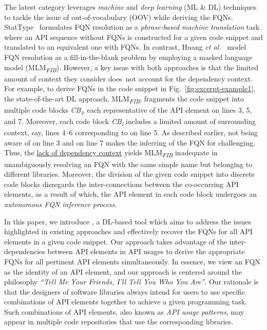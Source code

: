 The latest category leverages {\em machine} and {\em deep learning}
(ML \& DL) techniques to tackle the issue of out-of-vocabulary (OOV)
while deriving the FQNs.  StatType~\cite{icse18} formulates FQN
resolution as a {\em phrase-based machine translation} task where an
API sequence without FQNs is constructed for a given code snippet and
translated to an equivalent one with FQNs. In contrast, Huang {\em et
  al.}~\cite{prompt-ase22} model FQN resolution as a fill-in-the-blank
problem by employing a masked language model
(MLM\textsubscript{\textit{FIB}}).  However, a key issue with both
approaches is that the limited amount of context they consider
does~not account for the dependency context.
For example, to derive FQNs in the code snippet in
Fig.~\ref{fig:excerpt-example1}, the state-of-the-art DL approach,
MLM\textsubscript{\textit{FIB}}, fragments the code snippet into
multiple code blocks \textit{CB\textsubscript{i}}, each representative
of the API element on lines 3, 5, and 7. Moreover, each code block
\textit{CB\textsubscript{i}} includes a limited amount of surrounding
context, say, lines 4--6 corresponding to  on line 5. As
described earlier, not being aware of  on line 3 and
 on line 7 makes the inferring of the FQN for
 challenging. Thus, the \underline{lack of dependency
  context} yields MLM\textsubscript{\textit{FIB}} inadequate in
unambiguously resolving an FQN with the same simple name but belonging
to different libraries.
Moreover, the division of the given code snippet into discrete code blocks disregards the inter-connections between the co-occurring API elements, as a result of which, the API element in each code block undergoes an {\em autonomous FQN inference process}.

In this paper, we introduce {\tool}, a DL-based tool which aims to address the issues highlighted in existing approaches and effectively recover the FQNs for all API elements in a given code snippet. Our approach takes advantage of the inter-dependencies between API elements in API usages to derive the appropriate FQNs for all pertinent API elements simultaneously. In essence, we view an FQN as the identity of an API element, and our approach is centered around the philosophy {\em ``Tell Me Your Friends, I'll Tell You Who You Are''}. 
Our rationale is that the designers of software libraries always intend for users to use specific combinations of API elements together to achieve a given programming task. Such combinations of API elements, also known as {\em API usage patterns}, may appear in multiple code repositories that use the corresponding libraries.

